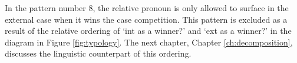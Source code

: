 In the pattern number 8, the relative pronoun is only allowed to surface in the external case when it wins the case competition. This pattern is excluded as a result of the relative ordering of `\ac{int} as a winner?' and `\ac{ext} as a winner?' in the diagram in Figure \ref{fig:typology}. The next chapter, Chapter \ref{ch:decomposition}, discusses the linguistic counterpart of this ordering.
